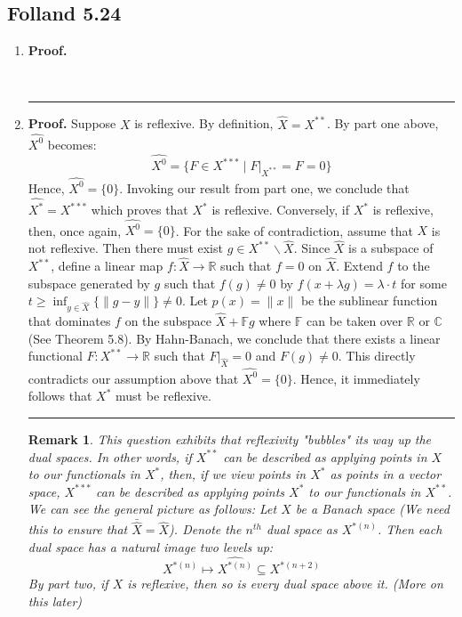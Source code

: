 \documentclass[12pt]{article}%
\newtheorem{remark}[theorem]{Remark}
\newenvironment{proof}[1][Proof]{\textbf{#1.} }{\ \rule{0.5em}{0.5em}}
\newcommand{\R}{\mathbb{R}}
\newcommand{\C}{\mathbb{C}}
\begin{document}
\subsection{Folland 5.24}
\begin{enumerate}
\item 
\begin{proof}

\end{proof}
\item
\begin{proof}
Suppose $X$ is reflexive. By definition, $\hat{X} = X^{**}$. By part one above, $\widehat{X^0}$ becomes:
$$ \widehat{X^0} = \{ F \in X^{***} \mid F |_{X^{**}} = F = 0 \}$$ Hence, 
$\widehat{X^0} = \{ 0 \}$. Invoking our result from part one, we conclude that $\widehat{X^*} = X^{***}$ which proves that $X^*$ is reflexive. Conversely, if $X^*$ is reflexive, then, once again, $\widehat{X^0} = \{ 0 \}$. For the sake of contradiction, assume that 
$X$ is not reflexive. Then there must exist $g \in X^{**} \backslash \hat{X}$. Since $\hat{X}$ is a subspace of $X^{**}$, define a linear map $f: \hat{X} \rightarrow \R$ such that $f = 0$ on $\hat{X}$. Extend $f$ to the subspace generated by $g$ such that $f(g) \neq 0$ by $f(x + \lambda g) = \lambda \cdot t$ for some $t \geq \inf_{y \in \hat{X}} \{ \|g - y\|\} \neq 0$. Let $p(x) = \| x\|$ be the sublinear function that dominates $f$ on the subspace $\hat{X} + \mathbb{F}g$ where $\mathbb{F}$ can be taken over $\R$ or $\C$ (See Theorem 5.8). By Hahn-Banach, we conclude that there exists a linear functional $F: X^{**} \rightarrow \R$ such that $F|_{\hat{X}} = 0$ and $F(g) \neq 0$. This directly contradicts our assumption above that $\widehat{X^0} = \{ 0 \}$. Hence, it immediately follows that $X^*$ must be reflexive. 
\end{proof}

\begin{remark}
This question exhibits that reflexivity "bubbles" its way up the dual spaces. In other words, if $X^{**}$ can be described as applying points in $X$ to our functionals  in $X^*$, then, if we view points in $X^*$ as points in a vector space, $X^{***}$ can be described as applying points $X^*$ to our functionals in $X^{**}$. We can see the general picture as follows: Let $X$ be a Banach space (We need this to ensure that $\bar{\hat{X}} = \hat{X}$). Denote the $n^{th}$ dual space as $X^{*(n)}$. Then each dual space has a natural image two levels up: 
$$ X^{*(n)} \mapsto \widehat{X^{*(n)}} \subseteq X^{*(n+2)}$$
By part two, if $X$ is reflexive, then so is every dual space above it. (More on this later)
\end{remark}

\end{enumerate}
\end{document}
